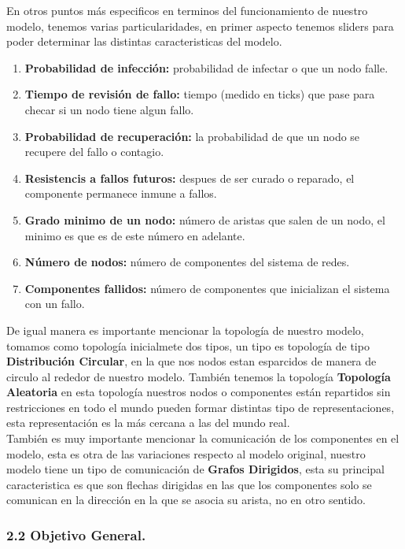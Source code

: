\documentclass[12pt]{article}
\begin{document}
En otros puntos más especificos en terminos del funcionamiento de nuestro modelo, tenemos varias particularidades, en primer aspecto tenemos sliders para poder determinar las distintas caracteristicas del modelo.\\
\begin{enumerate}
    \item \textbf{Probabilidad de infección:} probabilidad de infectar o que un nodo falle.
    \item \textbf{Tiempo de revisión de fallo:} tiempo (medido en ticks) que pase para checar si un nodo tiene algun fallo.
    \item \textbf{Probabilidad de recuperación:} la probabilidad de que un nodo se recupere del fallo o contagio.
    \item \textbf{Resistencis a fallos futuros:} despues de ser curado o reparado, el componente permanece inmune a fallos.
    \item \textbf{Grado minimo de un nodo:} número de aristas que salen de un nodo, el minimo es que es de este número en adelante.
    \item \textbf{Número de nodos:} número de componentes del sistema de redes.
    \item \textbf{Componentes fallidos:} número de componentes que inicializan el sistema con un fallo.
\end{enumerate} 

De igual manera es importante mencionar la topología de nuestro modelo, tomamos como topología inicialmete dos tipos, un tipo es topología de tipo \textbf{Distribución Circular}, en la que nos nodos estan esparcidos de manera de circulo al rededor de nuestro modelo.
También tenemos la topología \textbf{Topología Aleatoria} en esta topología nuestros nodos o componentes están repartidos sin restricciones en todo el mundo pueden formar distintas tipo de representaciones, esta representación es la más cercana a las del mundo real.\\

También es muy importante mencionar la comunicación de los componentes en el modelo, esta es otra de las variaciones respecto al modelo original, nuestro modelo tiene un tipo de comunicación de \textbf{Grafos Dirigidos}, esta su principal caracteristica es que son flechas dirigidas en las que los componentes solo se comunican en la dirección en la que se asocia su arista, no en otro sentido.

{\color{red} \subsubsection*{2.2 Objetivo General.}}
\vspace{1em}
\end{document}
